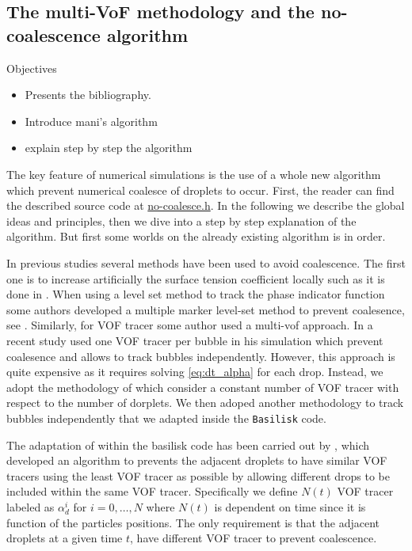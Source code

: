 \subsection{The multi-VoF methodology and the no-coalescence algorithm}
Objectives 
\begin{itemize}
    \item Presents the bibliography. 
    \item Introduce mani's algorithm
    \item explain step by step the algorithm
\end{itemize}


The key feature of numerical simulations is the use of a whole new algorithm which prevent numerical coalesce of droplets to occur.
First, the reader can find the described source code at \href{https://basilisk.fr/sandbox/fintzin/no-coalesce.h}{no-coalesce.h}. 
In the following we describe the global ideas and principles, then we dive into a step by step explanation of the algorithm. 
But first some worlds on the already existing algorithm is in order.

In previous studies several methods have been used to avoid coalescence. 
The first one is to increase artificially the surface tension coefficient locally such as it is done in \citet{hidman2023assessing}.
When using a level set method to track the  phase indicator function some authors developed a multiple marker level-set method to prevent coalesence, see \citet{balcazar2015multiple}. 
Similarly, for VOF tracer some author used a multi-vof approach. 
In a recent study \citet{zhang2021direct} used one VOF tracer per bubble in his simulation which prevent coalesence and allows to track bubbles independently. 
However, this approach is quite expensive as it requires solving \ref{eq:dt_alpha} for each drop. 
Instead, we adopt the methodology of \citet{karnakov2022computing} which consider a constant number of VOF tracer with respect to the number of dorplets. 
We then adoped another methodology to track bubbles independently that we adapted inside the \texttt{Basilisk} code. 

The adaptation of \citet{karnakov2022computing} within the basilisk code has been carried out by \citet{mani2021numerical} , which developed an algorithm to prevents the adjacent droplets to have similar VOF tracers using the least VOF tracer as possible by allowing different drops to be included within the same VOF tracer.
Specifically we define $N(t)$ VOF tracer labeled as $\alpha_d^i$ for $i =0,\ldots,N$ where $N(t)$ is dependent on time since it is function of the particles positions.  
The only requirement is that the adjacent droplets at a given time $t$, have different VOF tracer to prevent coalescence. 


